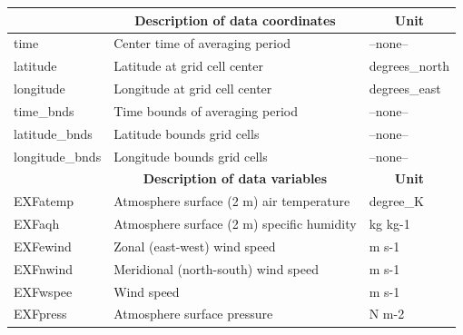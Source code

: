\begin{longtable}{|m{}|m{}|m{}|}
\hline \endhead \hline \endfoot
\rowcolor{lightgray} \multicolumn{1}{|c|}{\textbf{Coordinates}} & \multicolumn{1}{|c|}{\textbf{Description of data coordinates}} &  \multicolumn{1}{|c|}{\textbf{Unit}}\\ \hline
time &Center time of averaging period &--none--  \\ \hline
latitude &Latitude at grid cell center &degrees\_north  \\ \hline
longitude &Longitude at grid cell center &degrees\_east  \\ \hline
time\_bnds &Time bounds of averaging period &--none--  \\ \hline
latitude\_bnds &Latitude bounds grid cells &--none--  \\ \hline
longitude\_bnds &Longitude bounds grid cells &--none--  \\ \hline
\rowcolor{lightgray} \multicolumn{1}{|c|}{\textbf{Variables}} & \multicolumn{1}{|c|}{\textbf{Description of data variables}} &  \multicolumn{1}{|c|}{\textbf{Unit}}\\ \hline
EXFatemp &Atmosphere surface (2 m) air temperature  &degree\_K  \\ \hline
EXFaqh &Atmosphere surface (2 m) specific humidity  &kg kg-1  \\ \hline
EXFewind &Zonal (east-west) wind speed &m s-1  \\ \hline
EXFnwind &Meridional (north-south) wind speed &m s-1  \\ \hline
EXFwspee &Wind speed &m s-1  \\ \hline
EXFpress &Atmosphere surface pressure &N m-2  \\ \hline
\end{longtable}

\newp
\pagebreak
